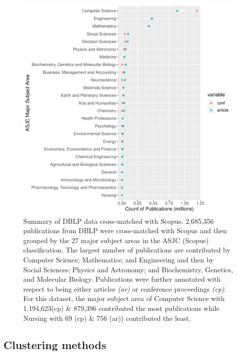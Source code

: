 \begin{figure}[ht]
  \includegraphics[scale=0.6]{ar_cp_ratio.pdf}
\caption{Summary of DBLP data cross-matched with Scopus. 2,685,356 publications from DBLP were cross-matched with Scopus and then grouped by the 27 major subject areas in the ASJC (Scopus) classification. The largest number of publications are contributed by Computer Science; Mathematics; and Engineering and then by Social Sciences; Physics and Astronomy; and Biochemistry, Genetics, and Molecular Biology. Publications were further annotated with respect to being either articles \emph{(ar)} or conference proceedings \emph{(cp)}. For this dataset, the major subject area of Computer Science with 1,194,623(cp) \& 879,396 contributed the most publications while Nursing with 69 (cp) \& 756 (ar)) contributed the least.}
\label{fig:ar_cp_annotation}       %
\end{figure}

\subsection{Clustering methods}


